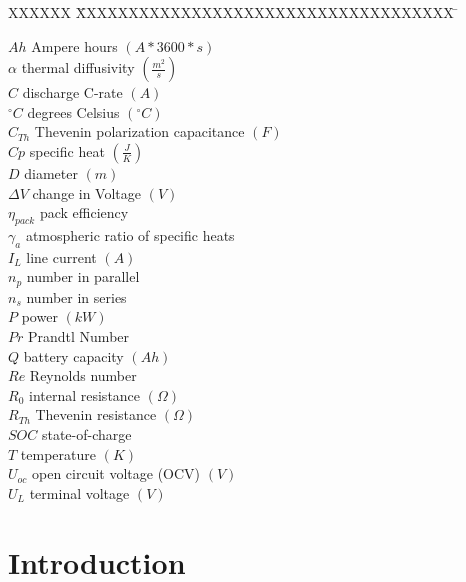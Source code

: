 \documentclass[]{aiaa-tc}%
\begin{document}
\begin{multicols}{2}
 \begin{tabbing}
  XXXXXX \= XXXXXXXXXXXXXXXXXXXXXXXXXXXXXXXXXXXX \= \kill %
  
  $Ah$ \> Ampere hours $(A*3600*s)$ \\
  $\alpha$ \> thermal diffusivity $(\frac{m^{2}}{s})$\\
  $C$ \> discharge C-rate $(A)$\\
  $^\circ C$ \> degrees Celsius $(^\circ C)$\\
  $C_{Th}$ \> Thevenin polarization capacitance $(F)$ \\
  $Cp$ \> specific heat $(\frac{J}{K})$\\
  $D$ \> diameter $(m)$\\
  $\Delta V$ \> change in Voltage $(V)$\\
  $\eta_{pack}$ \> pack efficiency \\
  $\gamma_a$ \> atmospheric ratio of specific heats \\
  $I_{L}$ \> line current $(A)$ \\
  $n_p$ \> number in parallel \\
  $n_s$ \> number in series \\
  $P$ \> power $(kW)$ \\
  $Pr$ \> Prandtl Number \\
  $Q$\> battery capacity $(Ah)$\\
  $Re$ \> Reynolds number \\
  $R_{0}$ \> internal resistance $(\Omega)$ \\
  $R_{Th}$ \> Thevenin resistance $(\Omega)$ \\
  $SOC$ \> state-of-charge \\
  $T$ \> temperature $(K)$\\
  $U_{oc}$ \> open circuit voltage (OCV) $(V)$ \\
  $U_{L}$ \> terminal voltage $(V)$ \\

 \end{tabbing}
\end{multicols}
\newpage


\section{Introduction}
\end{document}
